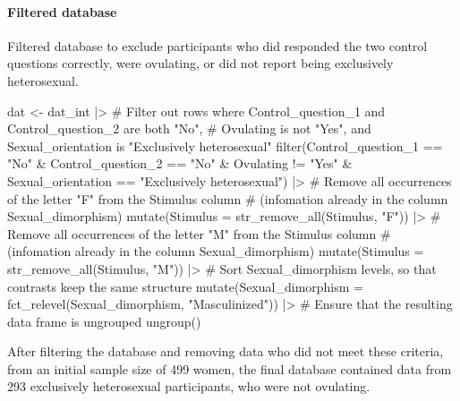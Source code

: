 \documentclass[
  bookmarksnumbered]{article}
\newenvironment{Shaded}{\begin{snugshade}}{\end{snugshade}}
\newcommand{\AttributeTok}[1]{\textcolor[rgb]{0.80,0.80,0.80}{#1}}
\newcommand{\CommentTok}[1]{\textcolor[rgb]{0.50,0.62,0.50}{#1}}
\newcommand{\FunctionTok}[1]{\textcolor[rgb]{0.94,0.94,0.56}{#1}}
\newcommand{\NormalTok}[1]{\textcolor[rgb]{0.80,0.80,0.80}{#1}}
\newcommand{\OtherTok}[1]{\textcolor[rgb]{0.94,0.94,0.56}{#1}}
\newcommand{\SpecialCharTok}[1]{\textcolor[rgb]{0.86,0.64,0.64}{#1}}
\newcommand{\StringTok}[1]{\textcolor[rgb]{0.80,0.58,0.58}{#1}}
\begin{document}
\paragraph{Filtered database}\label{filtered-database}

Filtered database to exclude participants who did responded the two control questions correctly, were ovulating, or did not report being exclusively heterosexual.

\begin{Shaded}
\begin{Highlighting}[]
\NormalTok{dat }\OtherTok{\textless{}{-}}\NormalTok{ dat\_int }\SpecialCharTok{|\textgreater{}}
  \CommentTok{\# Filter out rows where Control\_question\_1 and Control\_question\_2 are both "No",}
  \CommentTok{\# Ovulating is not "Yes", and Sexual\_orientation is "Exclusively heterosexual"}
  \FunctionTok{filter}\NormalTok{(Control\_question\_1 }\SpecialCharTok{==} \StringTok{"No"} \SpecialCharTok{\&}
\NormalTok{           Control\_question\_2 }\SpecialCharTok{==} \StringTok{"No"} \SpecialCharTok{\&}
\NormalTok{           Ovulating }\SpecialCharTok{!=} \StringTok{"Yes"} \SpecialCharTok{\&}
\NormalTok{           Sexual\_orientation }\SpecialCharTok{==} \StringTok{"Exclusively heterosexual"}\NormalTok{) }\SpecialCharTok{|\textgreater{}}
  \CommentTok{\# Remove all occurrences of the letter "F" from the Stimulus column}
  \CommentTok{\# (infomation already in the column Sexual\_dimorphism)}
  \FunctionTok{mutate}\NormalTok{(}\AttributeTok{Stimulus =} \FunctionTok{str\_remove\_all}\NormalTok{(Stimulus, }\StringTok{"F"}\NormalTok{)) }\SpecialCharTok{|\textgreater{}}
  \CommentTok{\# Remove all occurrences of the letter "M" from the Stimulus column}
  \CommentTok{\# (infomation already in the column Sexual\_dimorphism)}
  \FunctionTok{mutate}\NormalTok{(}\AttributeTok{Stimulus =} \FunctionTok{str\_remove\_all}\NormalTok{(Stimulus, }\StringTok{"M"}\NormalTok{)) }\SpecialCharTok{|\textgreater{}}
  \CommentTok{\# Sort Sexual\_dimorphism levels, so that contrasts keep the same structure}
  \FunctionTok{mutate}\NormalTok{(}\AttributeTok{Sexual\_dimorphism =} \FunctionTok{fct\_relevel}\NormalTok{(Sexual\_dimorphism, }\StringTok{"Masculinized"}\NormalTok{)) }\SpecialCharTok{|\textgreater{}} 
  \CommentTok{\# Ensure that the resulting data frame is ungrouped}
  \FunctionTok{ungroup}\NormalTok{()}
\end{Highlighting}
\end{Shaded}

After filtering the database and removing data who did not meet these criteria, from an initial sample size of 499 women, the final database contained data from 293 exclusively heterosexual participants, who were not ovulating.
\end{document}
